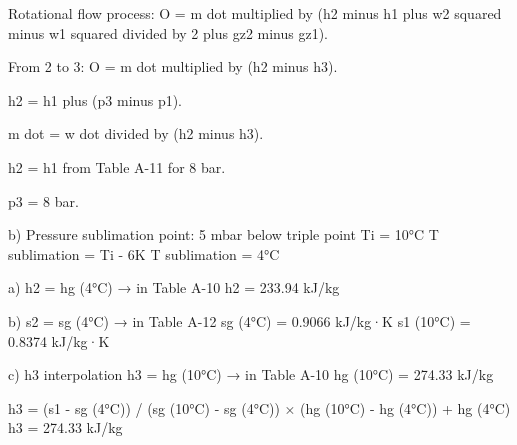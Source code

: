 Rotational flow process:  
O = m dot multiplied by (h2 minus h1 plus w2 squared minus w1 squared divided by 2 plus gz2 minus gz1).  

From 2 to 3:  
O = m dot multiplied by (h2 minus h3).  

h2 = h1 plus (p3 minus p1).  

m dot = w dot divided by (h2 minus h3).  

h2 = h1 from Table A-11 for 8 bar.  

p3 = 8 bar.

b) Pressure sublimation point: 5 mbar below triple point  
Ti = 10°C  
T sublimation = Ti - 6K  
T sublimation = 4°C  

a) h2 = hg (4°C) → in Table A-10  
h2 = 233.94 kJ/kg  

b) s2 = sg (4°C) → in Table A-12  
sg (4°C) = 0.9066 kJ/kg·K  
s1 (10°C) = 0.8374 kJ/kg·K  

c) h3 interpolation  
h3 = hg (10°C) → in Table A-10  
hg (10°C) = 274.33 kJ/kg  

h3 = (s1 - sg (4°C)) / (sg (10°C) - sg (4°C)) × (hg (10°C) - hg (4°C)) + hg (4°C)  
h3 = 274.33 kJ/kg